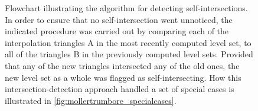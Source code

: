 \begin{figure}[htpb]
    \centering
    \resizebox{0.9\linewidth}{!}%
    {}
    \caption[Flowchart illustrating the algorithm for detecting
    self-intersections]
    {Flowchart illustrating the algorithm for detecting self-intersections.
        In order to ensure that no self-intersection went unnoticed, the
        indicated procedure was carried out by comparing each of the
        interpolation triangles A in the most recently computed level set,
        to all of the triangles B in the previously computed level sets.
        Provided that any of the new triangles intersected any of the old ones,
        the new level set as a whole was flagged as self-intersecting. How
        this intersection-detection approach handled a set of special cases
        is illustrated in \cref{fig:mollertrumbore_specialcases}.
    }
    \label{fig:intersection_flowchart}
\end{figure}
